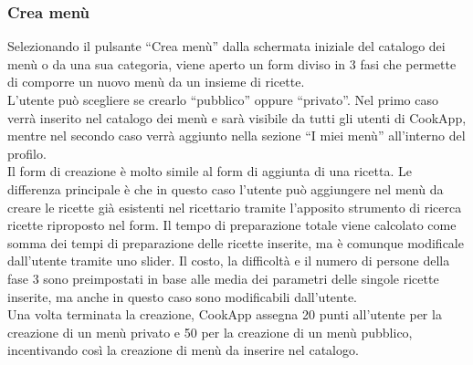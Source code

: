 \subsubsection{Crea menù}
Selezionando il pulsante ``Crea menù'' dalla schermata iniziale del
catalogo dei menù o da una sua categoria, viene aperto un form diviso in
3 fasi che permette di comporre un nuovo menù da un insieme di
ricette.\\
L'utente può scegliere se crearlo ``pubblico'' oppure ``privato''. Nel primo
caso verrà inserito nel catalogo dei menù e sarà visibile da tutti gli
utenti di CookApp, mentre nel secondo caso verrà aggiunto nella sezione
``I miei menù'' all'interno del profilo.\\ 
Il form di creazione è molto simile al form di aggiunta di una ricetta.
Le differenza principale è che in questo caso l'utente può aggiungere
nel menù da creare le ricette già esistenti nel ricettario tramite
l'apposito strumento di ricerca ricette riproposto nel form. Il tempo di
preparazione totale viene calcolato come somma dei tempi di preparazione
delle ricette inserite, ma è comunque modificale dall'utente tramite uno
slider. Il costo, la difficoltà e il numero di persone della fase 3 sono preimpostati
in base alle media dei parametri delle singole ricette inserite, ma
anche in questo caso sono modificabili dall'utente.\\
Una volta terminata la creazione, CookApp assegna 20 punti all'utente
per la creazione di un 
menù privato e 50 per la creazione di un menù pubblico, incentivando
così la creazione di menù da inserire nel catalogo. 

